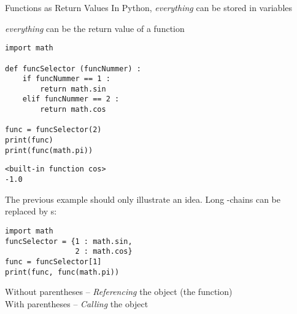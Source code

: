 \begin{frame}[fragile]{Functions as Return Values}
%
In Python, \emph{everything} can be stored in variables

\Thus \emph{everything} can be the return value of a function

%
\begin{tcbraster}[raster columns=2,
                  raster equal height,
                  nobeforeafter,
                  raster column skip=0.5cm]
\begin{codebox}
\begin{verbatim}
import math

def funcSelector (funcNummer) :
    if funcNummer == 1 :
        return math.sin
    elif funcNummer == 2 :
        return math.cos

func = funcSelector(2)
print(func)
print(func(math.pi))
\end{verbatim}
\end{codebox}
%
\begin{cmdbox}
\begin{verbatim}
<built-in function cos>
-1.0
\end{verbatim}
\end{cmdbox}
\end{tcbraster}
%
\end{frame}



\begin{frame}[fragile]
%
\begin{hintbox}
\small
The previous example should only illustrate an idea. Long  -chains can be replaced by s:

\vspace{6pt}
\begin{codebox}
\begin{verbatim}
import math
funcSelector = {1 : math.sin,
                2 : math.cos}
func = funcSelector[1]
print(func, func(math.pi))
\end{verbatim}
\end{codebox}
\end{hintbox}
%
\begin{hintbox}
Without parentheses -- \emph{Referencing} the object (\ie the function)\\
With parentheses -- \emph{Calling} the object
\end{hintbox}
%
\end{frame}

